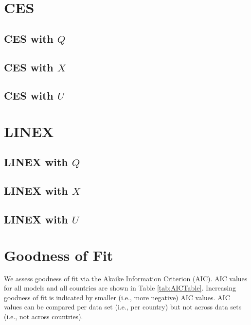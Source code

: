 \documentclass[preprint,authoryear,12pt]{elsarticle}\usepackage{graphicx, color}
\begin{document}
\section{CES}




\subsection{CES with $Q$}






\subsection{CES with $X$}

\subsection{CES with $U$}

\section{LINEX}

\subsection{LINEX with $Q$}

\subsection{LINEX with $X$}

\subsection{LINEX with $U$}

\section{Goodness of Fit}




We assess goodness of fit via the Akaike Information Criterion (AIC). AIC values for all models and all countries are shown in Table \ref{tab:AICTable}. Increasing goodness of fit is indicated by smaller (i.e., more negative) AIC values. AIC values can be compared per data set (i.e., per country) but not across data sets (i.e., not across countries). 
\end{document}
